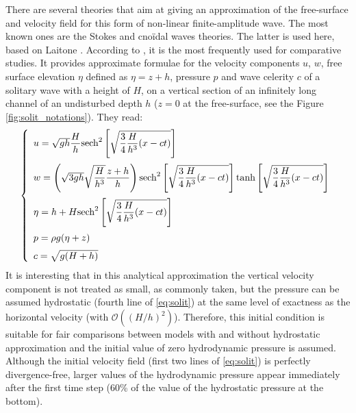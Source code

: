 There are several theories that aim at giving an approximation of the free-surface and velocity
field for this form of non-linear finite-amplitude wave. The most known ones are the Stokes and cnoïdal
waves theories. The latter is used here, based on Laitone \cite{Laitone1960}. According to \cite{Jankowski1999}, it
is the most frequently used for comparative studies.
It provides approximate formulae for the
velocity components $u$, $w$, free surface elevation $\eta$ defined as $\eta = z + h$,
pressure $p$ and wave celerity $c$ of a
solitary wave with a height of $H$, on a vertical section of an infinitely long channel of an undisturbed
depth $h$ ($z = 0$ at the free-surface, see the Figure \ref{fig:solit_notations}). They read:
\begin{equation}
\label{eq:solit}
\left\{\begin{array}{l}
u = \sqrt{gh}\dfrac{H}{h}\text{sech}^2\left[\sqrt{\dfrac{3}{4}\dfrac{H}{h^3}(x-ct)}\right] \medskip \\
w = \left(\sqrt{3gh}\sqrt{\dfrac{H}{h^3}}\dfrac{z+h}{h}\right)\text{sech}^2\left[\sqrt{\dfrac{3}{4}\dfrac{H}{h^3}(x-ct)}\right]
\text{tanh}\left[\sqrt{\dfrac{3}{4}\dfrac{H}{h^3}(x-ct)}\right] \medskip \\
\eta = h+H\text{sech}^2\left[\sqrt{\dfrac{3}{4}\dfrac{H}{h^3}(x-ct)}\right] \medskip \\
p= \rho g (\eta + z) \medskip \\
c = \sqrt{g(H+h)}
\end{array}\right.
\end{equation}
It is interesting that in this analytical approximation the vertical velocity component is
not treated as small, as commonly taken, but the pressure can be assumed hydrostatic
(fourth line of \eqref{eq:solit}) at the same level of exactness as the horizontal velocity
(with $\mathcal{O}((H/h)^2)$)\cite{Laitone1960}.
Therefore, this initial condition is suitable for fair comparisons between models
with and without hydrostatic approximation and the initial value of zero hydrodynamic
pressure is assumed. Although the initial velocity field (first two lines of \eqref{eq:solit})
is perfectly divergence-free, larger values of the hydrodynamic pressure appear immediately after the first time
step (60\% of the value of the hydrostatic pressure at the bottom).\\

